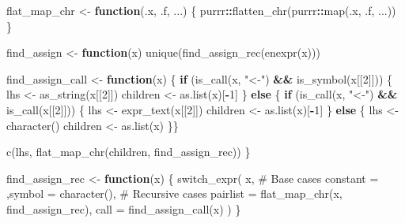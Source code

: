 \documentclass[
]{krantz}
\makeatletter
\newenvironment{Shaded}{\begin{snugshade}}{\end{snugshade}}
\newcommand{\CommentTok}[1]{\textcolor[rgb]{0.56,0.35,0.01}{\textit{#1}}}
\newcommand{\ControlFlowTok}[1]{\textcolor[rgb]{0.13,0.29,0.53}{\textbf{#1}}}
\newcommand{\DataTypeTok}[1]{\textcolor[rgb]{0.13,0.29,0.53}{#1}}
\newcommand{\DecValTok}[1]{\textcolor[rgb]{0.00,0.00,0.81}{#1}}
\newcommand{\KeywordTok}[1]{\textcolor[rgb]{0.13,0.29,0.53}{\textbf{#1}}}
\newcommand{\NormalTok}[1]{#1}
\newcommand{\OperatorTok}[1]{\textcolor[rgb]{0.81,0.36,0.00}{\textbf{#1}}}
\newcommand{\StringTok}[1]{\textcolor[rgb]{0.31,0.60,0.02}{#1}}
\newenvironment{kframe}{%
\medskip{}
\setlength{\fboxsep}{.8em}
 \def\at@end@of@kframe{}%
 \ifinner\ifhmode%
  \def\at@end@of@kframe{\end{minipage}}%
  \begin{minipage}{\columnwidth}%
 \fi\fi%
 \def\FrameCommand##1{\hskip\@totalleftmargin \hskip-\fboxsep
 \colorbox{shadecolor}{##1}\hskip-\fboxsep
     \hskip-\linewidth \hskip-\@totalleftmargin \hskip\columnwidth}%
 \MakeFramed {\advance\hsize-\width
   \@totalleftmargin\z@ \linewidth\hsize
   \@setminipage}}%
 {\par\unskip\endMakeFramed%
 \at@end@of@kframe}
\renewenvironment{Shaded}{\begin{kframe}}{\end{kframe}}
\renewcommand{\KeywordTok} [1]{\textcolor[rgb]{0.00,0.44,0.13}{{#1}}}
\renewcommand{\DataTypeTok}[1]{\textcolor[rgb]{0.56,0.13,0.00}{{#1}}}
\renewcommand{\DecValTok}  [1]{\textcolor[rgb]{0.25,0.63,0.44}{{#1}}}
\renewcommand{\StringTok}  [1]{\textcolor[rgb]{0.25,0.44,0.63}{{#1}}}
\renewcommand{\CommentTok} [1]{\textcolor[rgb]{0.38,0.63,0.69}{{#1}}}
\renewcommand{\NormalTok}  [1]{{#1}}
\makeatother
\begin{document}
\begin{Shaded}
\begin{Highlighting}[]
\NormalTok{flat_map_chr <-}\StringTok{ }\ControlFlowTok{function}\NormalTok{(.x, .f, ...) \{}
\NormalTok{  purrr}\OperatorTok{::}\KeywordTok{flatten_chr}\NormalTok{(purrr}\OperatorTok{::}\KeywordTok{map}\NormalTok{(.x, .f, ...))}
\NormalTok{\}}

\NormalTok{find_assign <-}\StringTok{ }\ControlFlowTok{function}\NormalTok{(x) }\KeywordTok{unique}\NormalTok{(}\KeywordTok{find_assign_rec}\NormalTok{(}\KeywordTok{enexpr}\NormalTok{(x)))}

\NormalTok{find_assign_call <-}\StringTok{ }\ControlFlowTok{function}\NormalTok{(x) \{}
  \ControlFlowTok{if}\NormalTok{ (}\KeywordTok{is_call}\NormalTok{(x, }\StringTok{"<-"}\NormalTok{) }\OperatorTok{&&}\StringTok{ }\KeywordTok{is_symbol}\NormalTok{(x[[}\DecValTok{2}\NormalTok{]])) \{}
\NormalTok{    lhs <-}\StringTok{ }\KeywordTok{as_string}\NormalTok{(x[[}\DecValTok{2}\NormalTok{]])}
\NormalTok{    children <-}\StringTok{ }\KeywordTok{as.list}\NormalTok{(x)[}\OperatorTok{-}\DecValTok{1}\NormalTok{]}
\NormalTok{  \} }\ControlFlowTok{else}\NormalTok{ \{}
    \ControlFlowTok{if}\NormalTok{ (}\KeywordTok{is_call}\NormalTok{(x, }\StringTok{"<-"}\NormalTok{) }\OperatorTok{&&}\StringTok{ }\KeywordTok{is_call}\NormalTok{(x[[}\DecValTok{2}\NormalTok{]])) \{}
\NormalTok{      lhs <-}\StringTok{ }\KeywordTok{expr_text}\NormalTok{(x[[}\DecValTok{2}\NormalTok{]])}
\NormalTok{      children <-}\StringTok{ }\KeywordTok{as.list}\NormalTok{(x)[}\OperatorTok{-}\DecValTok{1}\NormalTok{]}
\NormalTok{    \} }\ControlFlowTok{else}\NormalTok{ \{}
\NormalTok{      lhs <-}\StringTok{ }\KeywordTok{character}\NormalTok{()}
\NormalTok{      children <-}\StringTok{ }\KeywordTok{as.list}\NormalTok{(x)}
\NormalTok{    \}\}}
  
  \KeywordTok{c}\NormalTok{(lhs, }\KeywordTok{flat_map_chr}\NormalTok{(children, find_assign_rec))}
\NormalTok{\}}

\NormalTok{find_assign_rec <-}\StringTok{ }\ControlFlowTok{function}\NormalTok{(x) \{}
  \KeywordTok{switch_expr}\NormalTok{(}
\NormalTok{    x,}
    \CommentTok{# Base cases}
    \DataTypeTok{constant =}\NormalTok{ ,}\DataTypeTok{symbol =} \KeywordTok{character}\NormalTok{(),}
    \CommentTok{# Recursive cases}
    \DataTypeTok{pairlist =} \KeywordTok{flat_map_chr}\NormalTok{(x, find_assign_rec),}
    \DataTypeTok{call =} \KeywordTok{find_assign_call}\NormalTok{(x)}
\NormalTok{  )}
\NormalTok{\}}


\end{Highlighting}
\end{Shaded}
\end{document}
